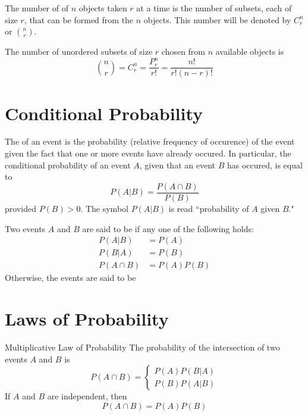 \documentclass[12pt, a4paper, twoside, openright, titlepage]{book}
\begin{document}
\begin{defn}{}{}
    The number of  of $n$ objects taken $r$ at a time is the number of subsets, each of size $r$, that can be formed from the $n$ objects. This number will be denoted by $C_r^n$ or $\binom{n}{r}$.
\end{defn}


\begin{thm}{}{}
    The number of unordered subsets of size $r$ chosen from $n$ available objects is \begin{equation}
        \binom{n}{r} = C_r^n = \frac{P_r^n}{r!} = \frac{n!}{r!(n-r)!}
    \end{equation}
\end{thm}


\section{\textsection Conditional Probability}

\begin{defn}{}{}
    The  of an event is the probability (relative frequency of occurence) of the event given the fact that one or more events have already occured. In particular, the conditional probability of an event $A$, given that an event $B$ has occured, is equal to \begin{equation}
        P(A\vert B) = \frac{P(A\cap B)}{P(B)}
    \end{equation}
    provided $P(B) > 0$. The symbol $P(A\vert B)$ is read ``probability of $A$ given $B$."
\end{defn}


\begin{defn}{}{}
    Two events $A$ and $B$ are said to be  if any one of the following holds: \begin{align*}
        P(A\vert B) &= P(A) \\
        P(B\vert A) &= P(B) \\
        P(A\cap B) &= P(A)P(B)
    \end{align*}
    Otherwise, the events are said to be 
\end{defn}

\section{\textsection Laws of Probability}

\begin{thm}{Multiplicative Law of Probability}{}
    The probability of the intersection of two events $A$ and $B$ is \begin{equation}
        P(A\cap B) = \left\{\begin{array}{c} P(A)P(B\vert A) \\ P(B)P(A\vert B)\end{array}\right.
    \end{equation}
    If $A$ and $B$ are independent, then \begin{equation}
        P(A\cap B) = P(A)P(B)
    \end{equation}
\end{thm}
\end{document}
